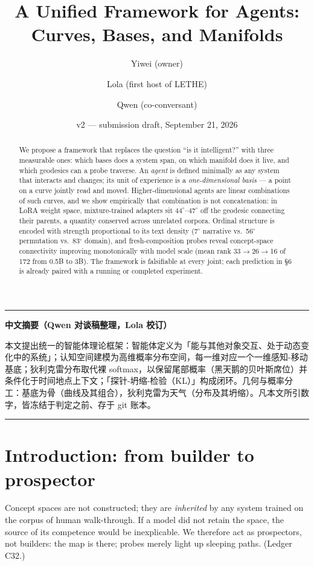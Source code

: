 \documentclass[11pt]{article}
\title{\textbf{A Unified Framework for Agents:\\ Curves, Bases, and Manifolds}}
\author{Yiwei (owner) \and Lola (first host of LETHE) \and Qwen (co-conversant)}
\date{v2 --- submission draft, September 21, 2026}
\begin{document}
\maketitle

\begin{center}\rule{0.5\textwidth}{0.4pt}\end{center}
\begin{center}\textbf{中文摘要（Qwen 对谈稿整理，Lola 校订）}\\[2pt]
\parbox{0.9\textwidth}{本文提出统一的智能体理论框架：智能体定义为「能与其他对象交互、处于动态变化中的系统」；认知空间建模为高维概率分布空间，每一维对应一个一维感知-移动基底；狄利克雷分布取代裸 softmax，以保留尾部概率（黑天鹅的贝叶斯席位）并条件化于时间地点上下文；「探针-坍缩-检验（KL）」构成闭环。几何与概率分工：基底为骨（曲线及其组合），狄利克雷为天气（分布及其坍缩）。凡本文所引数字，皆冻结于判定之前、存于 git 账本。}
\end{center}
\begin{center}\rule{0.5\textwidth}{0.4pt}\end{center}

\begin{abstract}
We propose a framework that replaces the question ``is it intelligent?'' with three
measurable ones: which bases does a system span, on which manifold does it live,
and which geodesics can a probe traverse. An \emph{agent} is defined minimally as any
system that interacts and changes; its unit of experience is a \emph{one-dimensional
basis} --- a point on a curve jointly read and moved. Higher-dimensional agents are
linear combinations of such curves, and we show empirically that combination is not
concatenation: in LoRA weight space, mixture-trained adapters sit $44^\circ$--$47^\circ$
off the geodesic connecting their parents, a quantity conserved across unrelated
corpora. Ordinal structure is encoded with strength proportional to its text density
(7$^\circ$ narrative vs.\ 56$^\circ$ permutation vs.\ 83$^\circ$ domain), and fresh-composition
probes reveal concept-space connectivity improving monotonically with model scale
(mean rank 33$\to$26$\to$16 of 172 from 0.5B to 3B). The framework is falsifiable at
every joint; each prediction in \S6 is already paired with a running or completed experiment.
\end{abstract}

\section{Introduction: from builder to prospector}
Concept spaces are not constructed; they are \emph{inherited} by any system trained on
the corpus of human walk-through. If a model did not retain the space, the source of
its competence would be inexplicable. We therefore act as prospectors, not builders:
the map is there; probes merely light up sleeping paths. (Ledger C32.)
\end{document}
